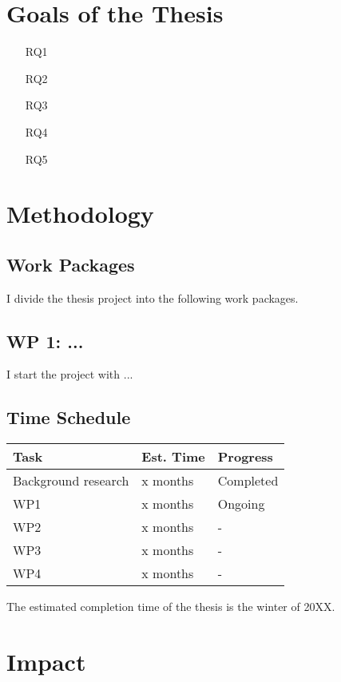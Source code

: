 \lipsum[1-1]

\section{Goals of the Thesis}

\lipsum[1-1]

\begin{itemize}
    \item[RQ1] \lipsum[1-1]
    \item[RQ2] \lipsum[2-2]
    \item[RQ3] \lipsum[3-3]
    \item[RQ4] \lipsum[4-4]
    \item[RQ5] \lipsum[5-5]
\end{itemize}

\lipsum[6-7]

\section{Methodology}

\lipsum[8-8]

\subsection{Work Packages}

I divide the thesis project into the following work packages.

\subsection*{WP 1: ...}

I start the project with ...

\subsection{Time Schedule}

\lipsum[9-9]

\begin{table}[h!]
\centering
\begin{tabular}{ l l l }
  \hline
  Task & Est. Time & Progress \\ \hline
  Background research & x months & Completed \\
  WP1 & x months & Ongoing \\
  WP2 & x months & - \\
  WP3 & x months & - \\
  WP4 & x months & - \\ \hline
\end{tabular}
\end{table}

The estimated completion time of the thesis is the winter of 20XX.

\section{Impact}
\lipsum[10-12]